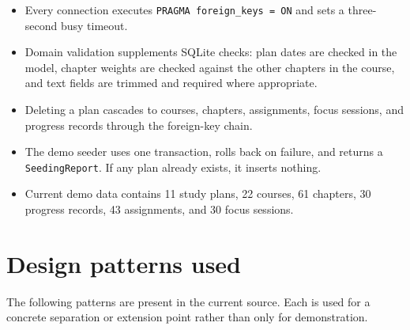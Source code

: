 \documentclass[11pt,a4paper]{article}
\newcommand{\code}[1]{\texttt{#1}}
\begin{document}
\begin{itemize}
  \item Every connection executes \code{PRAGMA foreign\_keys = ON} and sets a three-second busy timeout.
  \item Domain validation supplements SQLite checks: plan dates are checked in the model, chapter weights are checked against the other chapters in the course, and text fields are trimmed and required where appropriate.
  \item Deleting a plan cascades to courses, chapters, assignments, focus sessions, and progress records through the foreign-key chain.
  \item The demo seeder uses one transaction, rolls back on failure, and returns a \code{SeedingReport}. If any plan already exists, it inserts nothing.
  \item Current demo data contains 11 study plans, 22 courses, 61 chapters, 30 progress records, 43 assignments, and 30 focus sessions.
\end{itemize}

\section{Design patterns used}

The following patterns are present in the current source. Each is used for a concrete separation or extension point rather than only for demonstration.
\end{document}
